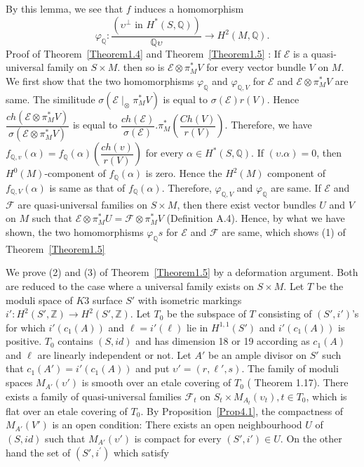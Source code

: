 By this lemma, we see that $f$ induces a homomorphism
$$
\varphi_{\mathbb{Q}}:\dfrac{(\upsilon^{\perp} \text{ in }
H^{\ast}(S,\mathbb{Q}))}{\mathbb{Q}\upsilon} \to H^{2}(M,\mathbb{Q}).
$$
Proof of Theorem~\ref{Theorem1.4} and Theorem~\ref{Theorem1.5} : If
$\mathscr{E}$ is a quasi-universal family on $S\times M$. then so is
$\mathscr{E}\otimes \pi^{\ast}_M V$ for every vector bundle $V$ on
$M$. We first show that the two homomorphisms $\varphi_{\mathbb{Q}}$
and $\varphi_{\mathbb{Q},V}$ for $\mathscr{E}$ and
$\mathscr{E}\otimes \pi^{\ast}_M V$ are same. The similitude
$\sigma(\mathscr{E}\mid_{\otimes}\pi^{\ast}_M V)$ is equal to
$\sigma(\mathscr{E})r(V)$. Hence
$\dfrac{ch(\mathscr{E}\otimes \pi^{\ast}_M
V)}{\sigma(\mathscr{E}\otimes \pi^{\ast}_M V)}$ is equal to
$\dfrac{ch(\mathscr{E})}{\sigma(\mathscr{E})}.\pi^{\ast}_M \left(\dfrac{Ch(V)}{r(V)}\right)$. Therefore,
we have
$f_{\mathbb{Q},v}(\alpha)=f_{\mathbb{Q}}(\alpha)\left(\dfrac{ch(v)}{r(V)}\right)$
for every $\alpha\in H^{\ast}(S,\mathbb{Q})$. If
$(\upsilon. \alpha)=0$, then $H^{0}(M)$-component of
$f_{\mathbb{Q}}(\alpha)$ is zero. Hence the $H^{2}(M)$ component of
$f_{\mathbb{Q},V}(\alpha)$ is same as that of
$f_{\mathbb{Q}}(\alpha)$. Therefore, $\varphi_{\mathbb{Q},V}$ and
$\varphi_{\mathbb{Q}}$ are same. If $\mathscr{E}$ and $\mathscr{F}$
are quasi-universal families on $S\times M$, then there exist vector
bundles $U$ and $V$ on $M$ such that
$\mathscr{E}\otimes \pi^{\ast}_{M}U=\mathscr{F}\otimes \pi^{\ast}_M V$
(Definition A.4). Hence, by what we have shown, the two homomorphisms
$\varphi_{\mathbb{Q}}s$ for $\mathscr{E}$ and $\mathscr{F}$ are same,
which shows (1) of Theorem~\ref{Theorem1.5}

We prove (2) and (3) of Theorem~\ref{Theorem1.5} by a deformation
argument. Both are reduced to the case where a universal family exists
on $S\times M$. Let $T$ be the moduli space of $K3$ surface $S'$ with
isometric markings $i':H^{2}(S',\mathbb{Z})\to
H^{2}(S',\mathbb{Z})$. Let $T_0$ be the subspace of $T$ consisting of
$(S',i')$'s for which $i'(c_1(A))$ and $\ell=i'(\ell)$ lie in
$H^{1,1}(S')$ and $i'(c_1(A))$ is positive. $T_0$ contains $(S,id)$\pageoriginale
and has dimension 18 or 19 according as $c_1(A)$ and $\ell$ are
linearly independent or not. Let $A'$ be an ample divisor on $S'$ such
that $c_1(A')=i'(c_1(A))$ and put $\upsilon'=(r,\ell',s)$. The family
of moduli spaces $M_{A'}(\upsilon')$ is smooth over an etale covering of
$T_0$ (\cite{key12} Theorem 1.17). There exists a family
of quasi-universal families $\mathscr{F}_t$ on $S_t\times
M_{A_t}(\upsilon_t), t\in T_0$, which is flat over an etale covering of
$T_0$. By Proposition~\ref{Prop4.1}, the compactness of $M_{A'}(V')$ is
an open condition: There exists an open neighbourhood $U$ of $(S,id)$
such that $M_{A'}(\upsilon')$ is compact for every $(S',i')\in U$. On
the other hand the set of $(S',i^{'})$ which satisfy


